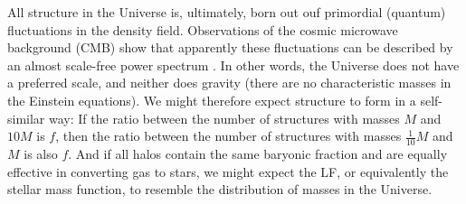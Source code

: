 \documentclass[useAMS,usenatbib,bibyear]{aa}
\begin{document}
All structure in the Universe is, ultimately, born out ouf primordial (quantum) fluctuations in the density field.
Observations of the cosmic microwave background (CMB) show that apparently these fluctuations can be described by an almost scale-free power spectrum \citep{PlanckCollaboration2018a}.
In other words, the Universe does not have a preferred scale, and neither does gravity (there are no characteristic masses in the Einstein equations).
We might therefore expect structure to form in a self-similar way: If the ratio between the number of structures with masses $M$ and $10M$ is $f$, then the ratio between the number of structures with masses $\frac{1}{10}M$ and $M$ is also $f$.
And if all halos contain the same baryonic fraction and are equally effective in converting gas to stars, we might expect the LF, or equivalently the stellar mass function, to resemble the distribution of masses in the Universe.
\end{document}
